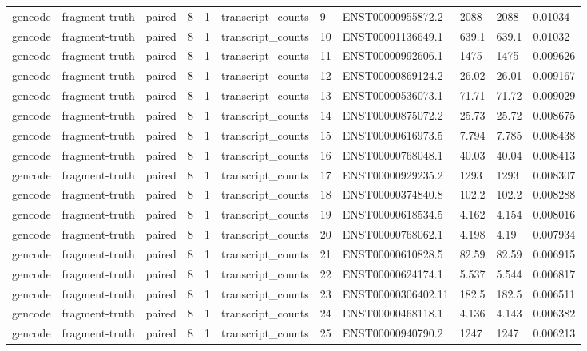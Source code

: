 \begin{tabular}{lllllllllll}
gencode & fragment-truth & paired & 8 & 1 & transcript\_counts & 9 & ENST00000955872.2 & 2088 & 2088 & 0.01034 \\
gencode & fragment-truth & paired & 8 & 1 & transcript\_counts & 10 & ENST00001136649.1 & 639.1 & 639.1 & 0.01032 \\
gencode & fragment-truth & paired & 8 & 1 & transcript\_counts & 11 & ENST00000992606.1 & 1475 & 1475 & 0.009626 \\
gencode & fragment-truth & paired & 8 & 1 & transcript\_counts & 12 & ENST00000869124.2 & 26.02 & 26.01 & 0.009167 \\
gencode & fragment-truth & paired & 8 & 1 & transcript\_counts & 13 & ENST00000536073.1 & 71.71 & 71.72 & 0.009029 \\
gencode & fragment-truth & paired & 8 & 1 & transcript\_counts & 14 & ENST00000875072.2 & 25.73 & 25.72 & 0.008675 \\
gencode & fragment-truth & paired & 8 & 1 & transcript\_counts & 15 & ENST00000616973.5 & 7.794 & 7.785 & 0.008438 \\
gencode & fragment-truth & paired & 8 & 1 & transcript\_counts & 16 & ENST00000768048.1 & 40.03 & 40.04 & 0.008413 \\
gencode & fragment-truth & paired & 8 & 1 & transcript\_counts & 17 & ENST00000929235.2 & 1293 & 1293 & 0.008307 \\
gencode & fragment-truth & paired & 8 & 1 & transcript\_counts & 18 & ENST00000374840.8 & 102.2 & 102.2 & 0.008288 \\
gencode & fragment-truth & paired & 8 & 1 & transcript\_counts & 19 & ENST00000618534.5 & 4.162 & 4.154 & 0.008016 \\
gencode & fragment-truth & paired & 8 & 1 & transcript\_counts & 20 & ENST00000768062.1 & 4.198 & 4.19 & 0.007934 \\
gencode & fragment-truth & paired & 8 & 1 & transcript\_counts & 21 & ENST00000610828.5 & 82.59 & 82.59 & 0.006915 \\
gencode & fragment-truth & paired & 8 & 1 & transcript\_counts & 22 & ENST00000624174.1 & 5.537 & 5.544 & 0.006817 \\
gencode & fragment-truth & paired & 8 & 1 & transcript\_counts & 23 & ENST00000306402.11 & 182.5 & 182.5 & 0.006511 \\
gencode & fragment-truth & paired & 8 & 1 & transcript\_counts & 24 & ENST00000468118.1 & 4.136 & 4.143 & 0.006382 \\
gencode & fragment-truth & paired & 8 & 1 & transcript\_counts & 25 & ENST00000940790.2 & 1247 & 1247 & 0.006213 \\

\end{tabular}
